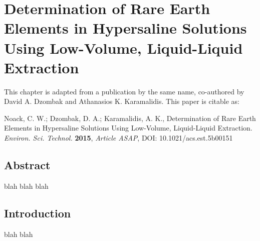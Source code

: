 \chapter{Determination of Rare Earth Elements in Hypersaline Solutions Using Low-Volume, Liquid-Liquid Extraction}

This chapter is adapted from a publication by the same name, co-authored by David A. Dzombak and Athanasios K. Karamalidis.
This paper is citable as: 

Noack, C. W.; Dzombak, D. A.; Karamalidis, A. K., Determination of Rare Earth Elements in Hypersaline Solutions Using Low-Volume, Liquid-Liquid Extraction. \textit{Environ. Sci. Technol.} \textbf{2015}, \textit{Article ASAP}, DOI: 10.1021/acs.est.5b00151

\clearpage

\section*{Abstract}
blah blah blah


\section{Introduction}

blah blah